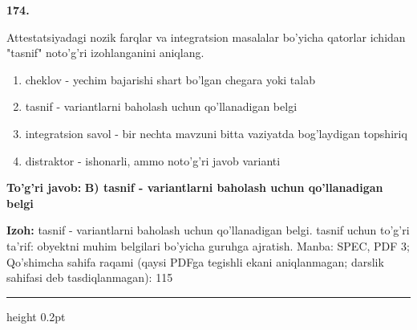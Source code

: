 \documentclass[10pt,a4paper]{article}
\begin{document}
{\bfseries\sffamily\color{ink} 174.}
\par
Attestatsiyadagi nozik farqlar va integratsion masalalar bo'yicha qatorlar ichidan "tasnif" noto'g'ri izohlanganini aniqlang.
\begin{enumerate}[label=\Alph*),leftmargin=9mm]
\item cheklov - yechim bajarishi shart bo'lgan chegara yoki talab
\item tasnif - variantlarni baholash uchun qo'llanadigan belgi
\item integratsion savol - bir nechta mavzuni bitta vaziyatda bog'laydigan topshiriq
\item distraktor - ishonarli, ammo noto'g'ri javob varianti
\end{enumerate}
\begin{tcolorbox}[enhanced,breakable,colback=teal!4,colframe=teal!60!black,boxrule=0.45pt,arc=1.2mm,left=2.7mm,right=2.7mm,top=1.8mm,bottom=1.8mm,before skip=2mm,after skip=2mm]
{\bfseries\sffamily\color{teal}To'g'ri javob:} \textbf{B) tasnif - variantlarni baholash uchun qo'llanadigan belgi}
\par\smallskip
{\bfseries Izoh:} tasnif - variantlarni baholash uchun qo'llanadigan belgi. tasnif uchun to'g'ri ta'rif: obyektni muhim belgilari bo'yicha guruhga ajratish. Manba: SPEC, PDF 3; Qo'shimcha sahifa raqami (qaysi PDFga tegishli ekani aniqlanmagan; darslik sahifasi deb tasdiqlanmagan): 115
\end{tcolorbox}
\vspace{2mm}\hrule height 0.2pt\vspace{3mm}
\end{document}
